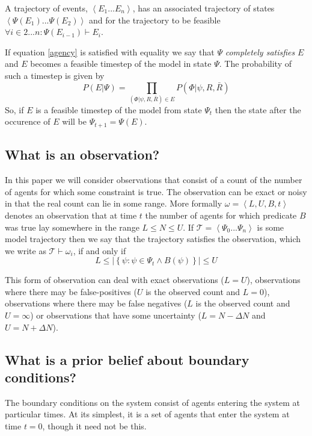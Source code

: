 \documentclass{article}
\begin{document}
A trajectory of events, $\left<E_1...E_n\right>$, has an associated trajectory of states $\left<\Psi(E_1)...\Psi(E_2)\right>$ and for the trajectory to be feasible $\forall i\in 2...n: \Psi(E_{i-1}) \vdash E_i$.

If equation \ref{agency} is satisfied with equality we say that $\Psi$ \textit{completely satisfies} $E$ and $E$ becomes a feasible timestep of the model in state $\Psi$. The probability of such a timestep is given by
\[
P(E|\Psi) = \prod_{(\Phi|\psi,R,\bar{R}) \in E} P(\Phi|\psi,R,\bar{R})
\]
So, if $E$ is a feasible timestep of the model from state $\Psi_t$ then the state after the occurence of $E$ will be $\Psi_{t+1} = \Psi(E)$.


\subsection{What is an observation?}

In this paper we will consider observations that consist of a count of the number of agents for which some constraint is true. The observation can be exact or noisy in that the real count can lie in some range. More formally $\omega = \left<L,U,B,t\right>$ denotes an observation that at time $t$ the number of agents for which predicate $B$ was true lay somewhere in the range  $L \le N \le U$. If $\mathcal{T} = \left<\Psi_0...\Psi_n\right>$ is some model trajectory then we say that the trajectory satisfies the observation, which we write as $\mathcal{T} \vdash \omega_i$, if and only if
\[
L \le \left|\left\{\psi:\psi \in \Psi_t \wedge B(\psi)\right\}\right| \le U
\]

This form of observation can deal with exact observations ($L=U$), observations where there may be false-positives ($U$ is the observed count and $L=0$), observations where there may be false negatives ($L$ is the observed count and $U=\infty$) or observations that have some uncertainty ($L = N - \Delta N$ and $U = N + \Delta N$).

\subsection{What is a prior belief about boundary conditions?}

The boundary conditions on the system consist of agents entering the system at particular times. At its simplest, it is a set of agents that enter the system at time $t=0$, though it need not be this.
\end{document}
